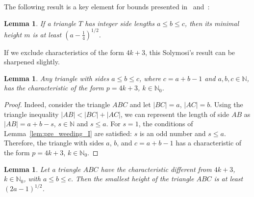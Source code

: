 \documentclass[a4paper,14pt]{article} %
\theoremstyle{plain}
\newtheorem{lemma}[theorem]{Lemma}
\theoremstyle{definition}
\begin{document}
The following result is a key element for bounds presented
in~\cite{solymosi2003note} and~\cite{my-semi-general-5-4-bound-2019}:

\begin{lemma}
	\cite[Observation 1]{solymosi2003note}
	If a triangle $T$ has integer side lengths $a \leq b \leq c$,
	then its minimal height $m$ is at least $\left(a - \frac{1}{4}\right)^{1/2}$.
\end{lemma}

If we exclude characteristics of the form $4k+3$, this Solymosi's result can be sharpened slightly.

\begin{lemma}
	\label{lem:triangle_4k_plus_3}
	Any triangle with sides $a \leq b \leq c$, where $c=a+b-1$ and $a, b, c \in \mathbb{N}$,
	has the characteristic of the form $p=4k+3$, $k\in \mathbb{N}_0$.
\end{lemma}

\begin{proof}
	Indeed, consider the triangle $ABC$ and let $|BC|=a$, $|AC|=b$.
	Using the triangle inequality $|AB| < |BC|+|AC|$,
	we can represent the length of side $AB$ as $|AB|=a+b-s$, $s \in \mathbb{N}$ and $s \leq a$.
	For $s=1$, the conditions of Lemma~\ref{lem:pre_weeding_I} are satisfied: $s$ is an odd number and $s \leq a$.
	Therefore, the triangle with sides $a$, $b$, and $c=a+b-1$
	has a characteristic of the form $p=4k+3$, $k\in \mathbb{N}_0$.
\end{proof}


\begin{lemma}
	\label{lem:triangle_height_our}
	Let a triangle $ABC$ have the characteristic different from $4k+3$, $k\in \mathbb{N}_0$, with $a\leq b\leq c$. Then the smallest height of the triangle $ABC$ is at least $(2a-1)^{1/2}$.
\end{lemma}
\end{document}
